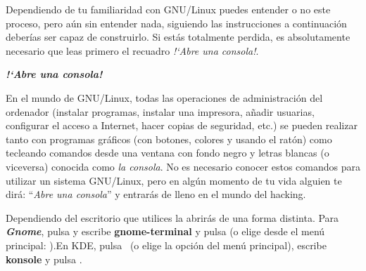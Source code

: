 \bigskip


\bigskip


\bigskip


\bigskip


\bigskip


\bigskip


\bigskip

Dependiendo de tu familiaridad con GNU/Linux puedes entender o no este
proceso, pero aún sin entender nada, siguiendo las instrucciones a
continuación deberías ser capaz de construirlo. Si estás
totalmente perdida, es absolutamente necesario que leas primero el
recuadro \textit{!`Abre una consola!}. 

\begin{center}
\begin{minipage}{16.947cm}
{\centering\bfseries\itshape
\label{ref:abreunaconsola}!`Abre una consola!
\par}

En el mundo de GNU/Linux, todas las operaciones de administración del
ordenador (instalar programas, instalar una impresora, añadir
usuarias, configurar el acceso a Internet, hacer copias de seguridad,
etc.) se pueden realizar tanto con programas gráficos (con botones,
colores y usando el ratón) como tecleando comandos desde una ventana
con fondo negro y letras blancas (o viceversa) conocida como \textit{la
consola}. No es necesario conocer estos comandos para utilizar un
sistema GNU/Linux, pero en algún momento de tu vida alguien te
dirá: {\textquotedblleft}\textit{Abre una
consola}{\textquotedblright} y entrarás de lleno en el mundo del
hacking.

Dependiendo del escritorio que utilices la abrirás de una forma
distinta. Para \textbf{\textit{Gnome}}, pulsa
y escribe \textbf{gnome-terminal} y
pulsa  (o elige desde el menú
principal: ).\textstyleGUIELEMENTREDUCED{ }En
KDE, pulsa  \ (o elige la opción
{\textquotesingle} del menú principal), escribe
\textbf{konsole} y pulsa . 




\end{minipage}
\end{center}
